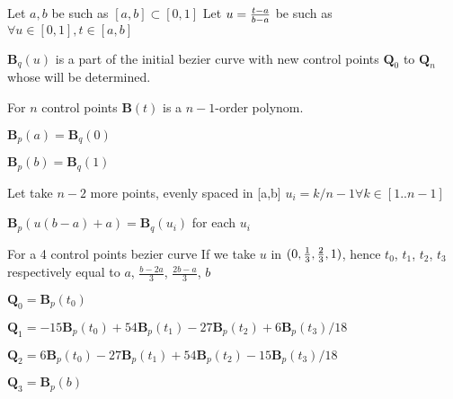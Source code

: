 \documentclass[12pt]{article}
\begin{document}
Let $a, b$ be such as $[a,b] \subset [0,1]$
Let $u = {{t - a} \over {b - a}}$ be such as $\forall u \in [0,1], t \in [a,b]$


$\boldsymbol{B}_q(u)$ is a part of the initial bezier curve with new control points $\boldsymbol{Q}_{0}$
to $\boldsymbol{Q}_{n}$ whose  will be determined.

For $n$ control points $\boldsymbol{B}(t)$ is a $n-1$-order polynom.

$\boldsymbol{B}_p(a) = \boldsymbol{B}_q(0)$

$\boldsymbol{B}_p(b) = \boldsymbol{B}_q(1)$

Let take $n-2$ more points, evenly spaced in [a,b]
$u_i = k / {n-1} \forall k \in [1 .. n-1]$

$\boldsymbol{B}_p(u (b - a) + a) = \boldsymbol{B}_q(u_i)$ for each $u_i$

For a 4 control points bezier curve
If we take $u$ in $(0, {1 \over 3}, {2 \over 3}, 1)$, hence $t_0$, $t_1$, $t_2$, $t_3$ respectively equal to  $a$, $\frac{b - 2 a}{3}$, $\frac{2b - a}{3}$, $b$

$ \boldsymbol{Q}_0 = \boldsymbol{B}_p(t_0) $

$ \boldsymbol{Q}_1 = {-15 \boldsymbol{B}_p(t_0) + 54 \boldsymbol{B}_p(t_1) -27 \boldsymbol{B}_p(t_2) + 6 \boldsymbol{B}_p(t_3)} / 18 $

$ \boldsymbol{Q}_2 = {6 \boldsymbol{B}_p(t_0) -27 \boldsymbol{B}_p(t_1) + 54 \boldsymbol{B}_p(t_2) -15 \boldsymbol{B}_p(t_3)} / 18 $

$ \boldsymbol{Q}_3 = \boldsymbol{B}_p(b) $

\end{document}
